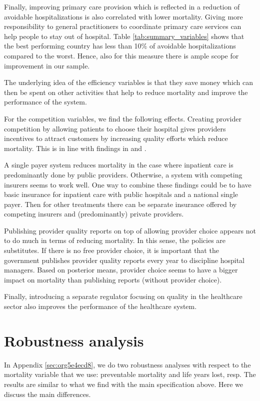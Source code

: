 \documentclass[a4paper,12pt]{article}
\begin{document}
Finally, improving primary care provision which is reflected in a reduction of avoidable hospitalizations is also correlated with lower mortality. Giving more responsibility to general practitioners to coordinate primary care services can help people to stay out of hospital. Table \ref{tab:summary_variables} shows that the best performing country has less than 10\% of avoidable hospitalizations compared to the worst. Hence, also for this measure there is ample scope for improvement in our sample. 

The underlying idea of the efficiency variables is that they save money which can then be spent on other activities that help to reduce mortality and improve the performance of the system.

For the competition variables, we find the following effects. Creating provider competition by allowing patients to choose their hospital gives providers incentives to attract customers by increasing quality efforts which reduce mortality. This is in line with findings in \cite{NBERw19800} and \cite{teisberg}.

A single payer system reduces mortality in the case where inpatient care is predominantly done by public providers. Otherwise, a system with competing insurers seems to work well. One way to combine these findings could be to have basic insurance for inpatient care with public hospitals and a national single payer. Then for other treatments there can be separate insurance offered by competing insurers and (predominantly) private providers.

Publishing provider quality reports on top of allowing provider choice appears not to do much in terms of reducing mortality. In this sense, the policies are substitutes. If there is no free provider choice, it is important that the government publishes provider quality reports every year to discipline hospital managers. Based on posterior means, provider choice seems to have a bigger impact on mortality than publishing reports (without provider choice).

Finally, introducing a separate regulator focusing on quality in the healthcare sector also improves the performance of the healthcare system.

\section{Robustness analysis}
\label{sec:org91d3aa0}

In Appendix \ref{sec:org5e4ecd8}, we do two robustness analyses with respect to the mortality variable that we use: preventable mortality and  life years lost, resp. The results are similar to what we find with the main specification above. Here we discuss the main differences.
\end{document}

